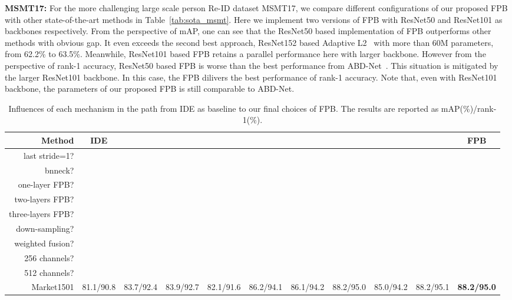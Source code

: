 \documentclass[journal]{IEEEtran}
\begin{document}
\textbf{MSMT17:} For the more challenging large scale person Re-ID dataset MSMT17, we compare different configurations of our proposed FPB with other state-of-the-art methods in Table~\ref{tab:sota_msmt}.
Here we implement two versions of FPB with ResNet50 and ResNet101 as backbones respectively.
From the perspective of mAP, one can see that the ResNet50 based implementation of FPB outperforms other methods with obvious gap.
It even exceeds the second best approach, ResNet152 based Adaptive L2~\cite{ni2020adaptive} with more than 60M parameters, from 62.2\% to 63.5\%.
Meanwhile, ResNet101 based FPB retains a parallel performance here with larger backbone.
However from the perspective of rank-1 accuracy, ResNet50 based FPB is worse than the best performance from ABD-Net~\cite{chen2019ABD}.
This situation is mitigated by the larger ResNet101 backbone.
In this case, the FPB dilivers the best performance of rank-1 accuracy.
Note that, even with ResNet101 backbone, the parameters of our proposed FPB is still comparable to ABD-Net.
\begin{table*}
  \centering
  \caption{Influences of each mechanism in the path from IDE as baseline to our final choices of FPB. The results are reported as mAP(\%)/rank-1(\%).}
  \label{tab:ablation1}
  \small
  \setlength{\tabcolsep}{3pt}
  \begin{tabular}{r|c|cccccccc|c}\hline
    Method & IDE & & & & & & & & & FPB \tabularnewline
    \hline
    last stride=1? & &  &  &  &  &  &  &  &  & \textbf{}\tabularnewline
    bnneck? & & &  &  &  &  &  &  &  & \textbf{} \tabularnewline
    one-layer FPB? & & & &  & & & & & & \tabularnewline
    two-layers FPB? & & & & &  & &  &  &  & \textbf{} \tabularnewline
    three-layers FPB? & & & & & &  & & & & \tabularnewline
    down-sampling? & & & & & & &  &  &  & \textbf{} \tabularnewline
    weighted fusion? & & & & & & & &  & & \tabularnewline
    256 channels? & & & &  &  &  &  &  & & \textbf{} \tabularnewline
    512 channels? & & & & & & & & &  & \tabularnewline
    \hline
    Market1501 & 81.1/90.8 & 83.7/92.4 & 83.9/92.7 & 82.1/91.6 & 86.2/94.1 & 86.1/94.2 & 88.2/95.0 & 85.0/94.2 & 88.2/95.1 & \textbf{88.2/95.0} \tabularnewline
    \hline
  \end{tabular}
\end{table*}
\end{document}
